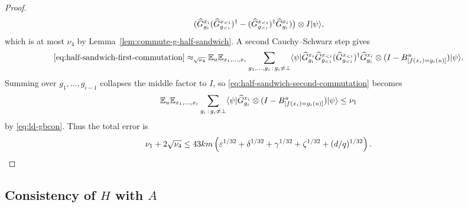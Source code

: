 \begin{proof}
\begin{equation}
		(\widehat G_{g_i}^{x_i}(\widehat G_{g_{<i}}^{x_{<i}})^\dagger - (\widehat G_{g_{<i}}^{x_{<i}})^\dagger \widehat G_{g_i}^{x_i})\bigr)
		\otimes I \lvert \psi \rangle,
	\end{equation}
	which is at most $\nu_4$ by Lemma~\ref{lem:commute-g-half-sandwich}. A second Cauchy--Schwarz step gives
	\begin{equation}\label{eq:half-sandwich-second-commutation}
		\eqref{eq:half-sandwich-first-commutation}
		\approx_{\sqrt{\nu_4}}
		\mathbb{E}_u \mathbb{E}_{x_1,\dots,x_i} \sum_{g_1,\dots,g_i\,:\,g_i\ne\bot}
		\langle \psi \rvert
		\widehat G_{g_i}^{x_i}\widehat G_{g_{<i}}^{x_{<i}}(\widehat G_{g_{<i}}^{x_{<i}})^\dagger \widehat G_{g_i}^{x_i}
		\otimes (I-B_{[f(x_i)=g_i(u)]}^u)\lvert \psi \rangle.
	\end{equation}
	Summing over $g_1,\dots,g_{i-1}$ collapses the middle factor to $I$, so \ref{eq:half-sandwich-second-commutation} becomes
	\[
		\mathbb{E}_u \mathbb{E}_{x_1,\dots,x_i} \sum_{g_i\,:\,g_i\ne\bot}
		\langle \psi \rvert \widehat G_{g_i}^{x_i} \otimes (I-B_{[f(x_i)=g_i(u)]}^u)\lvert \psi \rangle
		\le \nu_1
	\]
	by \ref{eq:ld-gbcon}. Thus the total error is
	\[
		\nu_1 + 2\sqrt{\nu_4}
		\le
		43km\left(\varepsilon^{1/32}+\delta^{1/32}+\gamma^{1/32}+\zeta^{1/32}+(d/q)^{1/32}\right).
	\]
\end{proof}

\subsection{Consistency of $H$ with $A$}
\label{sec:consistency-of-h-with-a}

